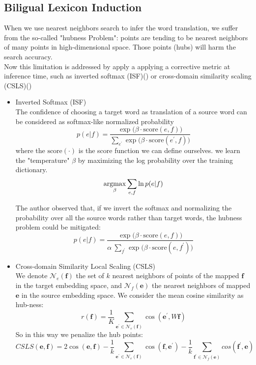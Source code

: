 \subsection{Biligual Lexicon Induction}
When we use nearest neighbors search to infer the word translation, we suffer from the so-called "hubness Problem": points are tending to be nearest neighbors of many points in high-dimensional space.  Those points (hubs) will harm the search accuracy.\\
Now this limitation is addressed by apply a applying a corrective metric at inference time, such as inverted softmax (ISF)(\cite{smith2017offline})  or cross-domain similarity scaling (CSLS)(\cite{conneau2017word})
\begin{itemize}
	\item Inverted Softmax (ISF)\\
	The confidence of choosing a target word as translation of a source word can be considered as softmax-like normalized probability
	\[ p(e|f) = \frac{\exp{\Big(\beta \cdot  \text{score}(e,f)\Big)}}{\sum_{e^{\prime}} {\exp{\Big(\beta \cdot \text{score}(e^{\prime}, f)\Big)}}} \]
	where the $\text{score}(\cdot)$ is the score function we can define ourselves.
	we learn the "temperature" $\beta$ by maximizing the log probability over the training dictionary. 
	\[ \underset{\beta}{\operatorname{argmax}} \sum_{e,f} \ln p(e|f)  \]
	
	The author observed that, if we invert the softmax and normalizing the probability over all the source words rather than target words, the hubness problem could be mitigated:
	\[ p(e|f) = \frac{\exp{\Big(\beta \cdot  \text{score}(e,f)\Big)}}{\alpha \  \sum_{f^{\prime}} {\exp{\Big(\beta \cdot \text{score}(e, f^{\prime})\Big)}}}\]
	\item  Cross-domain Similarity Local Scaling (CSLS)\\
	We denote ${\mathcal{N}_e(\bm{f})}$ the set of ${k}$ nearest neighbors of points of the mapped $\bm{f}$ in the target embedding space, and ${\mathcal{N}_f(\bm{e})}$ the nearest neighbors of mapped ${\bm{e}}$ in the source embedding space. We consider the mean cosine similarity as hub-ness:
	\[ r(\bm{f})= \frac{1}{K} \sum_{\bm{e}^{\prime} \in \mathcal{N}_e(\bm{f})} \cos(\bm{e}^{\prime}, W\bm{f})\]
	So in this way we penalize the hub points:
	\[ CSLS(\bm{e}, \bm{f}) = 2 \cos(\bm{e}, \bm{f}) - \frac{1}{k} \sum_{\bm{e^{\prime}} \in \mathcal{N}_e(\bm{f})} \cos(\bm{f}, \bm{e^{\prime}})- \frac{1}{k} \sum_{\bm{f^{\prime}} \in \mathcal{N}_f(\bm{e})} cos(\bm{f^{\prime}}, \bm{e}) \]
\end{itemize}


	